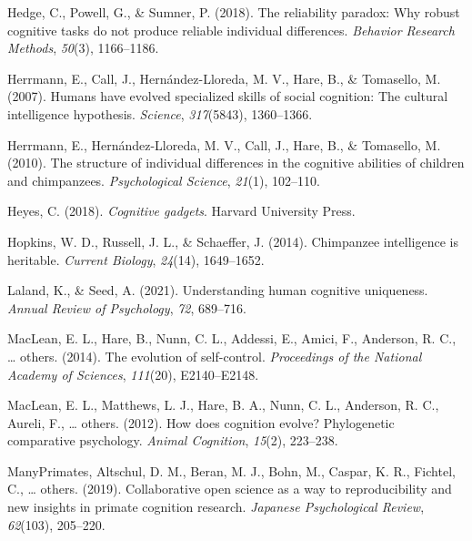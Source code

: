 \documentclass[
  man,floatsintext]{apa6}
\newlength{\cslhangindent}
\newlength{\cslentryspacingunit} %
\newenvironment{CSLReferences}[2] %
 {%
  \setlength{\parindent}{0pt}
  \ifodd #1
  \let\oldpar\par
  \def\par{\hangindent=\cslhangindent\oldpar}
  \fi
  \setlength{\parskip}{#2\cslentryspacingunit}
 }%
 {}
\begin{document}
\begin{CSLReferences}{1}{0}
\leavevmode{}%
Hedge, C., Powell, G., \& Sumner, P. (2018). The reliability paradox: Why robust cognitive tasks do not produce reliable individual differences. \emph{Behavior Research Methods}, \emph{50}(3), 1166--1186.

\leavevmode{}%
Herrmann, E., Call, J., Hernández-Lloreda, M. V., Hare, B., \& Tomasello, M. (2007). Humans have evolved specialized skills of social cognition: The cultural intelligence hypothesis. \emph{Science}, \emph{317}(5843), 1360--1366.

\leavevmode{}%
Herrmann, E., Hernández-Lloreda, M. V., Call, J., Hare, B., \& Tomasello, M. (2010). The structure of individual differences in the cognitive abilities of children and chimpanzees. \emph{Psychological Science}, \emph{21}(1), 102--110.

\leavevmode{}%
Heyes, C. (2018). \emph{Cognitive gadgets}. Harvard University Press.

\leavevmode{}%
Hopkins, W. D., Russell, J. L., \& Schaeffer, J. (2014). Chimpanzee intelligence is heritable. \emph{Current Biology}, \emph{24}(14), 1649--1652.

\leavevmode{}%
Laland, K., \& Seed, A. (2021). Understanding human cognitive uniqueness. \emph{Annual Review of Psychology}, \emph{72}, 689--716.

\leavevmode{}%
MacLean, E. L., Hare, B., Nunn, C. L., Addessi, E., Amici, F., Anderson, R. C., \ldots{} others. (2014). The evolution of self-control. \emph{Proceedings of the National Academy of Sciences}, \emph{111}(20), E2140--E2148.

\leavevmode{}%
MacLean, E. L., Matthews, L. J., Hare, B. A., Nunn, C. L., Anderson, R. C., Aureli, F., \ldots{} others. (2012). How does cognition evolve? Phylogenetic comparative psychology. \emph{Animal Cognition}, \emph{15}(2), 223--238.

\leavevmode{}%
ManyPrimates, Altschul, D. M., Beran, M. J., Bohn, M., Caspar, K. R., Fichtel, C., \ldots{} others. (2019). Collaborative open science as a way to reproducibility and new insights in primate cognition research. \emph{Japanese Psychological Review}, \emph{62}(103), 205--220.


\end{CSLReferences}
\end{document}
